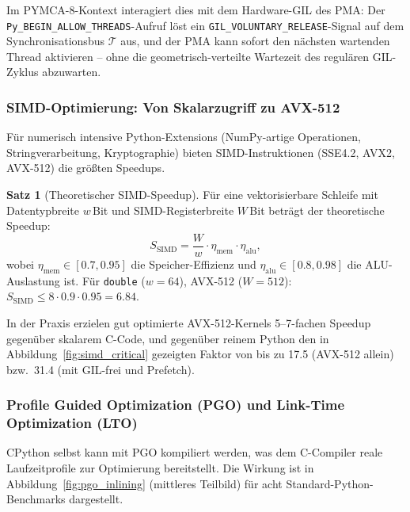 ﻿\documentclass[a4paper,12pt]{scrreprt}
\theoremstyle{definition}
\newtheorem{satz}{Satz}[section]
\begin{document}
	Im PYMCA-8-Kontext interagiert dies mit dem Hardware-GIL des PMA:
	Der \texttt{Py\_BEGIN\newline \_ALLOW\_THREADS}-Aufruf löst ein
	\texttt{GIL\_VOLUNTARY\_RELEASE}-Signal auf dem Synchronisationsbus
	$\mathcal{T}$ aus, und der PMA kann sofort den nächsten wartenden
	Thread aktivieren -- ohne die geometrisch-verteilte Wartezeit
	des regulären GIL-Zyklus abzuwarten.
	
	\subsubsection{SIMD-Optimierung: Von Skalarzugriff zu AVX-512}
	
	Für numerisch intensive Python-Extensions (NumPy-artige Operationen,
	Stringverarbeitung, Kryptographie) bieten SIMD-Instruktionen
	(SSE4.2, AVX2, AVX-512) die größten Speedups.
	
	\begin{satz}[Theoretischer SIMD-Speedup]
		\label{satz:simd_speedup}
		Für eine vektorisierbare Schleife mit Datentypbreite $w$\,Bit
		und SIMD-Registerbreite $W$\,Bit beträgt der theoretische Speedup:
		\[
		S_{\mathrm{SIMD}} = \frac{W}{w} \cdot \eta_{\mathrm{mem}}
		\cdot \eta_{\mathrm{alu}},
		\]
		wobei $\eta_{\mathrm{mem}} \in [0.7, 0.95]$ die Speicher-Effizienz
		und $\eta_{\mathrm{alu}} \in [0.8, 0.98]$ die ALU-Auslastung ist.
		Für \texttt{double} ($w = 64$), AVX-512 ($W = 512$):
		$S_{\mathrm{SIMD}} \le 8 \cdot 0.9 \cdot 0.95 = 6.84$.
	\end{satz}
	
	In der Praxis erzielen gut optimierte AVX-512-Kernels 5--7-fachen
	Speedup gegenüber skalarem C-Code, und gegenüber reinem Python
	den in Abbildung~\ref{fig:simd_critical} gezeigten Faktor von
	bis zu 17.5 (AVX-512 allein) bzw.\ 31.4 (mit GIL-frei und Prefetch).
	
	\subsubsection{Profile Guided Optimization (PGO) und Link-Time Optimization (LTO)}
	
	CPython selbst kann mit PGO kompiliert werden, was dem C-Compiler
	reale Laufzeitprofile zur Optimierung bereitstellt. Die Wirkung
	ist in Abbildung~\ref{fig:pgo_inlining} (mittleres Teilbild) für
	acht Standard-Python-Benchmarks dargestellt.
	
\end{document}
